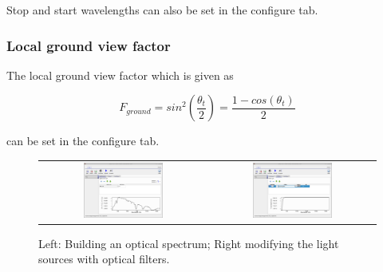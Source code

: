 Stop and start wavelengths can also be set in the configure tab.

\subsubsection{Local ground view factor}
The local ground view factor which is given as \cite{neryterrain}

\begin{equation}
F_{ground}=sin^2 \left ( \frac{\theta_t}{2}\right )=\frac{1-cos(\theta_t)}{2}
\end{equation}

can be set in the configure tab.

\begin{figure}[H]
\centering
\begin{tabular}{ c c }

\includegraphics[width=0.5\textwidth,height=0.4\textwidth]{./images/lights0.png}

&
\includegraphics[width=0.5\textwidth,height=0.4\textwidth]{./images/lights1.png}
\\
\end{tabular}
\caption{Left: Building an optical spectrum; Right modifying the light sources with optical filters.}
\end{figure}


